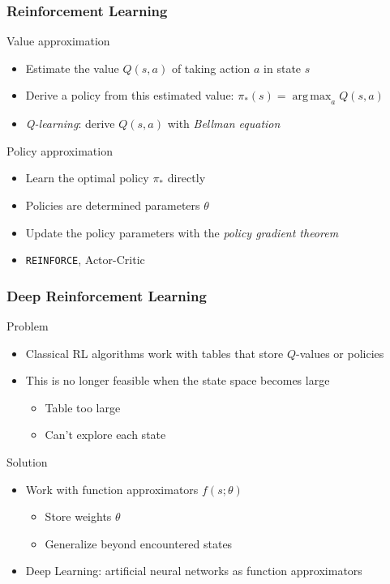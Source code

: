 \documentclass{beamer}
\DeclareMathOperator*{\argmax}{arg\,max} %
\begin{document}
\begin{frame}
\frametitle{Reinforcement Learning}
\begin{block}{Value approximation}
\begin{itemize}
    \item Estimate the value $Q(s,a) $ of taking action $a$ in state $s$
    \item Derive a policy from this estimated value: $\pi_{*}(s) = \argmax_{a} Q(s, a)$
    \item \emph{Q-learning}: derive $Q(s,a)$ with \emph{Bellman equation}
\end{itemize}
\end{block}

\begin{block}{Policy approximation}
\begin{itemize}
    \item Learn the optimal policy $\pi_{*}$ directly
    \item Policies are determined parameters $\theta$
    \item Update the policy parameters with the \emph{policy gradient theorem}
    \item {\tt REINFORCE}, Actor-Critic
\end{itemize}
\end{block}
\end{frame}

\begin{frame}
\frametitle{Deep Reinforcement Learning}
\begin{block}{Problem}
    \begin{itemize}
    \item Classical RL algorithms work with tables that store $Q$-values or policies
    \item This is no longer feasible when the state space becomes large
    \begin{itemize}
        \item Table too large
        \item Can't explore each state
    \end{itemize}
     \end{itemize}
\end{block}
\pause
\begin{block}{Solution}
    \begin{itemize}
    \item Work with function approximators $f(s; \theta)$
    \begin{itemize}
        \item Store weights $\theta$
        \item Generalize beyond encountered states
    \end{itemize}
            
    \item \alert{Deep Learning}: artificial neural networks as function approximators
    \end{itemize}
\end{block}
\end{frame}
\end{document}
